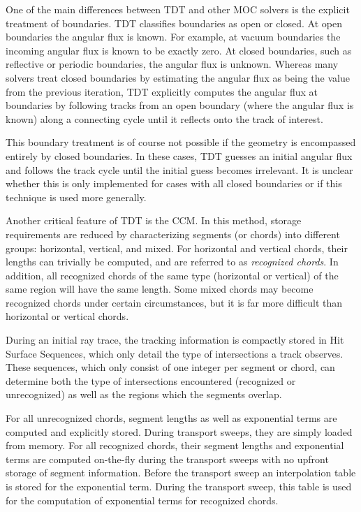 
One of the main differences between TDT and other \ac{MOC} solvers is the explicit treatment of boundaries. TDT classifies boundaries as open or closed. At open boundaries the angular flux is known. For example, at vacuum boundaries the incoming angular flux is known to be exactly zero. At closed boundaries, such as reflective or periodic boundaries, the angular flux is unknown. Whereas many solvers treat closed boundaries by estimating the angular flux as being the value from the previous iteration, TDT explicitly computes the angular flux at boundaries by following tracks from an open boundary (where the angular flux is known) along a connecting cycle until it reflects onto the track of interest.

This boundary treatment is of course not possible if the geometry is encompassed entirely by closed boundaries. In these cases, TDT guesses an initial angular flux and follows the track cycle until the initial guess becomes irrelevant. It is unclear whether this is only implemented for cases with all closed boundaries or if this technique is used more generally.

Another critical feature of TDT is the \ac{CCM}. In this method, storage requirements are reduced by characterizing segments (or chords) into different groups: horizontal, vertical, and mixed. For horizontal and vertical chords, their lengths can trivially be computed, and are referred to as \textit{recognized chords}. In addition, all recognized chords of the same type (horizontal or vertical) of the same region will have the same length. Some mixed chords may become recognized chords under certain circumstances, but it is far more difficult than horizontal or vertical chords.

During an initial ray trace, the tracking information is compactly stored in Hit Surface Sequences, which only detail the type of intersections a track observes. These sequences, which only consist of one integer per segment or chord, can determine both the type of intersections encountered (recognized or unrecognized) as well as the regions which the segments overlap.

For all unrecognized chords, segment lengths as well as exponential terms are computed and explicitly stored. During transport sweeps, they are simply loaded from memory. For all recognized chords, their segment lengths and exponential terms are computed on-the-fly during the transport sweeps with no upfront storage of segment information. Before the transport sweep an interpolation table is stored for the exponential term. During the transport sweep, this table is used for the computation of exponential terms for recognized chords. 

